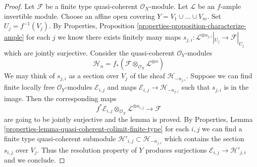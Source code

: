 \documentclass{stacks-project}
\theoremstyle{plain}
\theoremstyle{definition}
\theoremstyle{remark}
\numberwithin{equation}{subsection}
\begin{document}
\begin{proof}
Let $\mathcal{F}$ be a finite type quasi-coherent $\mathcal{O}_X$-module.
Let $\mathcal{L}$ be an $f$-ample invertible module.
Choose an affine open covering $Y = V_1 \cup \ldots \cup V_m$.
Set $U_j = f^{-1}(V_j)$. By Properties, Proposition
\ref{properties-proposition-characterize-ample}
for each $j$ we know there exists finitely many maps
$s_{j, i} : \mathcal{L}^{\otimes n_{j, i}}|_{U_j} \to \mathcal{F}|_{U_j}$
which are jointly surjective. Consider the quasi-coherent
$\mathcal{O}_Y$-modules
$$
\mathcal{H}_n =
f_*(\mathcal{F} \otimes_{\mathcal{O}_X} \mathcal{L}^{\otimes n})
$$
We may think of $s_{j, i}$ as a section over $V_j$ of the sheaf
$\mathcal{H}_{-n_{j, i}}$. Suppose we can find finite locally
free $\mathcal{O}_Y$-modules $\mathcal{E}_{i, j}$ and maps
$\mathcal{E}_{i, j} \to \mathcal{H}_{-n_{j, i}}$ such that
$s_{j, i}$ is in the image. Then the corresponding maps
$$
f^*\mathcal{E}_{i, j}
\otimes_{\mathcal{O}_X}
\mathcal{L}^{\otimes n_{i, j}} \longrightarrow \mathcal{F}
$$
are going to be jointly surjective and the lemma is proved. By
Properties, Lemma \ref{properties-lemma-quasi-coherent-colimit-finite-type}
for each $i, j$ we can find a finite
type quasi-coherent submodule
$\mathcal{H}'_{i, j} \subset  \mathcal{H}_{-n_{j, i}}$
which contains the section $s_{i, j}$ over $V_j$.
Thus the resolution property of $Y$ produces surjections
$\mathcal{E}_{i, j} \to \mathcal{H}'_{j, i}$ and we conclude.
\end{proof}
\end{document}
